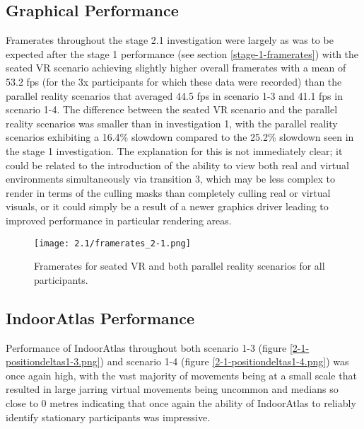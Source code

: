 \subsection{Graphical Performance}
\label{stage-2-1-framerates}
Framerates throughout the stage 2.1 investigation were largely as was to be expected after the stage 1 performance (see section \ref{stage-1-framerates}) with the seated VR scenario achieving slightly higher overall framerates with a mean of 53.2 fps (for the 3x participants for which these data were recorded) than the parallel reality scenarios that averaged 44.5 fps in scenario 1-3 and 41.1 fps in scenario 1-4. The difference between the seated VR scenario and the parallel reality scenarios was smaller than in investigation 1, with the parallel reality scenarios exhibiting a 16.4\% slowdown compared to the 25.2\% slowdown seen in the stage 1 investigation. The explanation for this is not immediately clear; it could be related to the introduction of the ability to view both real and virtual environments simultaneously via transition 3, which may be less complex to render in terms of the culling masks than completely culling real or virtual visuals, or it could simply be a result of a newer graphics driver leading to improved performance in particular rendering areas.

\begin{figure}[h]
	\begin{center}
	\texttt{[image: 2.1/framerates\_2-1.png]}
	\caption{Framerates for seated VR and both parallel reality scenarios for all participants.}
	\label{framerates_2-1.png}
	\end{center}
\end{figure}


\subsection{IndoorAtlas Performance}

Performance of IndoorAtlas throughout both scenario 1-3 (figure \ref{2-1-positiondeltas1-3.png}) and scenario 1-4 (figure \ref{2-1-positiondeltas1-4.png}) was once again high, with the vast majority of movements being at a small scale that resulted in large jarring virtual movements being uncommon and medians so close to 0 metres indicating that once again the ability of IndoorAtlas to reliably identify stationary participants was impressive.

